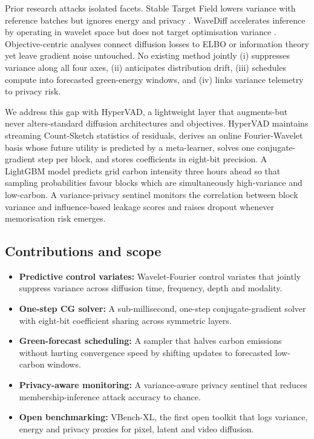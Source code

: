 \documentclass{article}
\begin{document}
Prior research attacks isolated facets. Stable Target Field lowers variance with reference batches but ignores energy and privacy \cite{xu-2023-stable}. WaveDiff accelerates inference by operating in wavelet space but does not target optimisation variance \cite{phung-2022-wavelet}. Objective-centric analyses connect diffusion losses to ELBO or information theory \cite{kingma-2023-understanding,kong-2023-information} yet leave gradient noise untouched. No existing method jointly (i) suppresses variance along all four axes, (ii) anticipates distribution drift, (iii) schedules compute into forecasted green-energy windows, and (iv) links variance telemetry to privacy risk.

We address this gap with HyperVAD, a lightweight layer that augments-but never alters-standard diffusion architectures and objectives. HyperVAD maintains streaming Count-Sketch statistics of residuals, derives an online Fourier-Wavelet basis whose future utility is predicted by a meta-learner, solves one conjugate-gradient step per block, and stores coefficients in eight-bit precision. A LightGBM model predicts grid carbon intensity three hours ahead so that sampling probabilities favour blocks which are simultaneously high-variance and low-carbon. A variance-privacy sentinel monitors the correlation between block variance and influence-based leakage scores and raises dropout whenever memorisation risk emerges.

\subsection{Contributions and scope}
\begin{itemize}
  \item \textbf{Predictive control variates:} Wavelet-Fourier control variates that jointly suppress variance across diffusion time, frequency, depth and modality.
  \item \textbf{One-step CG solver:} A sub-millisecond, one-step conjugate-gradient solver with eight-bit coefficient sharing across symmetric layers.
  \item \textbf{Green-forecast scheduling:} A sampler that halves carbon emissions without hurting convergence speed by shifting updates to forecasted low-carbon windows.
  \item \textbf{Privacy-aware monitoring:} A variance-aware privacy sentinel that reduces membership-inference attack accuracy to chance.
  \item \textbf{Open benchmarking:} VBench-XL, the first open toolkit that logs variance, energy and privacy proxies for pixel, latent and video diffusion.
\end{itemize}
\end{document}
